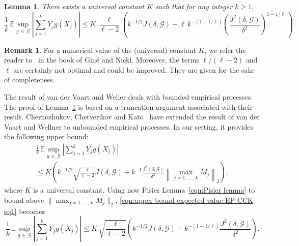 \documentclass[10pt]{amsart}
\newtheorem{lemm}[theo]{Lemma}\newtheorem{prop}[theo]{Proposition}\newtheorem{coro}[theo]{Corollary}\newtheorem{conj}[theo]{Conjecture}
\theoremstyle{definition}\newtheorem{defi}[theo]{Definition}\newtheorem{rema}[theo]{Remark}\newtheorem{exam}[theo]{Example}\newtheorem{exem}[theo]{Example}\newtheorem{nota}[theo]{Notation}
\newcommand{\bE}{\mathbb{E}}
\newcommand{\cG}{\mathcal{G}}
\newcommand{\caG}{\mathscr{G}}
\begin{document}
\begin{lemm}\label{lem:upper bound Ek power type tail}
There exists a universal constant $K$ such that for any integer $k\geq 1$,
\[
\frac{1}{k}\,\bE\sup_{g\,\in\,\caG}\left|\sum_{j=1}^k Y_jg(X_j)\right| \leq K\,\frac{\ell}{\ell-2}\left(k^{-1/2}J(\delta,\caG) +\ell\,k^{-(1-1/\ell)}\left(\dfrac{J^2(\delta,\caG)}{\delta^2}\right)^{1-1/\ell}\,\right).
\]
\end{lemm}

\begin{rema}
For a numerical value of the (universal) constant $K$, we refer the reader to~\cite[Section~3.5.1]{GN16} in the book of Giné and Nickl. Moreover, the terms $\ell/(\ell-2)$ and $\ell$ are certainly not optimal and could be improved. They are given for the sake of completeness.
\end{rema}

The result of van der Vaart and Weller deals with bounded empirical processes. The proof of Lemma~\ref{lem:upper bound Ek power type tail} is based on a truncation argument associated with their result. Chernozhukov, Chetverikov and Kato~\cite[Theorem~5.2]{CCK14} have extended the result of van der Vaart and Wellner to unbounded empirical processes. In our setting, it provides the following upper bound:
\begin{multline}\label{eqn:upper bound expected value EP CCK eq1}
\frac{1}{k}\,\bE\sup_{g\,\in\,\caG}\left|\sum_{j=1}^k Y_jg(X_j)\right| \\ \leq K\left(k^{-1/2}\sqrt{\frac{\ell}{\ell-2}} J(\delta,\cG)+k^{-1}\frac{J^2(\delta,\cG)}{\delta^2}\left\|\max_{j=1,\,\ldots,\,k}M_j\right\|_2\right),
\end{multline}
where $K$ is a universal constant. Using now Pisier Lemma~\eqref{eqn:Pisier lemma} to bound above $\|\max_{j=1,\,\ldots,\,k}M_j\|_2$, \eqref{eqn:upper bound expected value EP CCK eq1} becomes
\begin{equation}\label{eqn:upper bound expected value EP CCK eq2}
\frac{1}{k}\,\bE\sup_{g\,\in\,\caG}\left|\sum_{j=1}^k Y_jg(X_j)\right| \leq K\,\sqrt{\frac{\ell}{\ell-2}}\left(k^{-1/2} J(\delta,\cG)+k^{-(1-1/\ell)}\frac{J^2(\delta,\cG)}{\delta^2}\right).
\end{equation}
\end{document}
